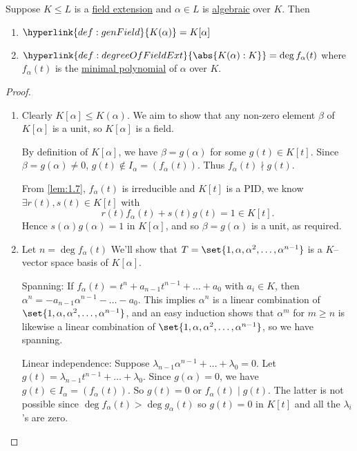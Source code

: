 \documentclass{article}
\begin{document}

\begin{nthm}\label{thm:1.9}
    Suppose $K \leq L$ is a \hyperlink{def:fieldExt}{field extension} and $\alpha \in L$ is \hyperlink{def:algebraic}{algebraic} over $K$.  Then
    \begin{enumerate}[label=(\roman*)]
        \item  $\hyperlink{def:genField}{K(\alpha)} = K[\alpha]$
        \item $\hyperlink{def:degreeOfFieldExt}{\abs{K(\alpha) : K}} = \deg f_\alpha(t)$ where $f_\alpha(t)$ is the \hyperlink{def:minimalPoly}{minimal polynomial} of $\alpha$ over $K$.
    \end{enumerate}
\end{nthm}

\begin{proof}\leavevmode
    \begin{enumerate}[label=(\roman*)]
        \item Clearly $K[\alpha] \leq K(\alpha)$. We aim to show that any non-zero element $\beta$ of $K[\alpha]$ is a unit, so $K[\alpha]$ is a field.

            By definition of $K[\alpha]$, we have $\beta = g(\alpha)$ for some $g(t) \in K[t]$.
            Since $\beta = g(\alpha) \neq 0$, $g(t) \notin I_\alpha = (f_\alpha(t))$.
            Thus $f_\alpha(t) \nmid g(t)$.

            From \cref{lem:1.7}, $f_\alpha(t)$ is irreducible and $K[t]$ is a PID, we know $\exists r(t), s(t) \in K[t]$ with
            \begin{equation*}r(t) f_\alpha(t) + s(t) g(t) = 1 \in K[t].\end{equation*}
            Hence $s(\alpha) g(\alpha) = 1$ in $K[\alpha]$, and so $\beta = g(\alpha)$ is a unit, as required.
        \item Let $n = \deg f_\alpha(t)$ We'll show that $T = \set{1, \alpha, \alpha^2, \dotsc, \alpha^{n-1}}$ is a $K$--vector space basis of $K[\alpha]$.

            Spanning: If $f_\alpha(t) = t^n + a_{n-1} t^{n-1} + \dots + a_0$ with $a_i \in K$, then $\alpha^n = -a_{n-1} \alpha^{n-1} - \dots - a_0$.
            This implies $\alpha^n$ is a linear combination of $\set{1, \alpha, \alpha^2, \dotsc, \alpha^{n-1}}$, and an easy induction shows that $\alpha^m$ for $m \geq n$ is likewise a linear combination of $\set{1, \alpha, \alpha^2, \dotsc, \alpha^{n-1}}$, so we have spanning.

            Linear independence: Suppose $\lambda_{n-1} \alpha^{n-1} + \dotsc + \lambda_0 = 0$.
            Let $g(t) = \lambda_{n-1} t^{n-1} + \dotsc + \lambda_0$.  Since $g(\alpha) = 0$, we have $g(t) \in I_\alpha = (f_\alpha(t)).$  So $g(t) = 0$ or $f_\alpha(t) \mid g(t)$.
            The latter is not possible since $\deg f_\alpha(t) > \deg g_\alpha(t)$ so $g(t) = 0$ in $K[t]$ and all the $\lambda_i$'s are zero. \qedhere
    \end{enumerate}
\end{proof}
\end{document}
